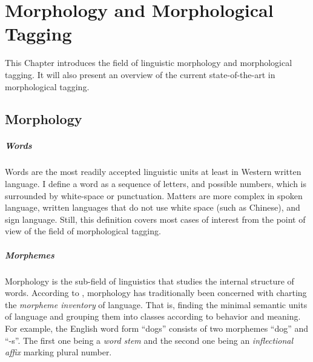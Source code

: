 \chapter{Morphology and Morphological Tagging}
\label{chap:morphology}

This Chapter introduces the field of linguistic morphology and
morphological tagging. It will also present an overview of the current
state-of-the-art in morphological tagging.

\section{Morphology}

\paragraph{Words} Words are the most readily accepted linguistic units
at least in Western written language. I define a word as a sequence of
letters, and possible numbers, which is surrounded by white-space or
punctuation. Matters are more complex in spoken language, written
languages that do not use white space (such as Chinese), and sign
language. Still, this definition covers most cases of interest from
the point of view of the field of morphological tagging.

\paragraph{Morphemes} Morphology is the sub-field of linguistics that
studies the internal structure of words. According to \cite{Bybee85},
morphology has traditionally been concerned with charting the {\it
  morpheme inventory} of language. That is, finding the minimal
semantic units of language and grouping them into classes according to
behavior and meaning. For example, the English word form ``dogs''
consists of two morphemes ``dog'' and ``-s''. The first one being a
{\it word stem} and the second one being an {\it inflectional affix}
marking plural number.

